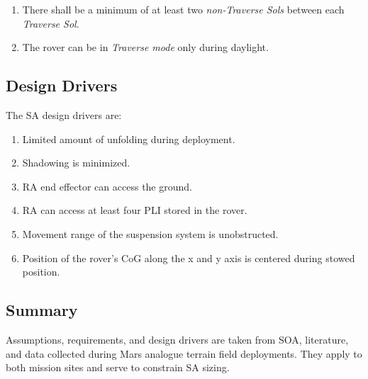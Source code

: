 \resetLeadingZeroCounter
\begin{enumerate}[leftmargin=1.47cm, label=\zeroLeadCounter{C}]
    \item There shall be a minimum of at least two \textit{non-Traverse Sols} between each \textit{Traverse Sol}.
    \item \label{itm:con:daylight_traverse} The rover can be in \textit{Traverse mode} only during daylight.
\end{enumerate}

\subsection{Design Drivers}
\label{sec:Design:RequirementsAndDesignDrivers:DesignDrivers}
The \ac{SA} design drivers are:

\resetLeadingZeroCounter
\begin{enumerate}[leftmargin=1.51cm, label=\zeroLeadCounter{D}]
    \item \label{itm:dd:limited_unfolding} Limited amount of unfolding during deployment.
    \item \label{itm:dd:shadowing} Shadowing is minimized.
    \item \label{itm:dd:end_effector} \ac{RA} end effector can access the ground.
    \item \label{itm:dd:four_plis} \ac{RA} can access at least four \ac{PLI} stored in the rover.
    \item \label{itm:dd:unobstructed} Movement range of the suspension system is unobstructed.
    \item \label{itm:dd:cog} Position of the rover's \ac{CoG} along the x and y axis is centered during stowed position.
\end{enumerate}

\subsection{Summary}
\label{sec:Design:RequirementsAndDesignDrivers:Summary}
Assumptions, requirements, and design drivers are taken from \ac{SOA}, literature, and data collected during Mars analogue terrain field deployments. They apply to both mission sites and serve to constrain \ac{SA} sizing.
